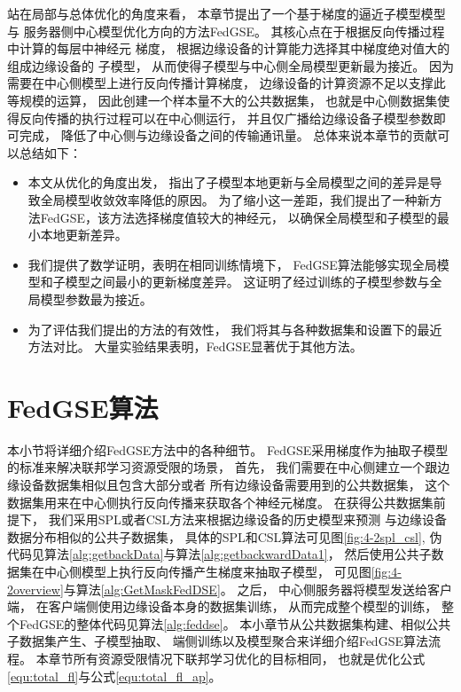 站在局部与总体优化的角度来看，
本章节提出了一个基于梯度的逼近子模型模型与
服务器侧中心模型优化方向的方法FedGSE。
其核心点在于根据反向传播过程中计算的每层中神经元
梯度，
根据边缘设备的计算能力选择其中梯度绝对值大的组成边缘设备的
子模型，
从而使得子模型与中心侧全局模型更新最为接近。
因为需要在中心侧模型上进行反向传播计算梯度，
边缘设备的计算资源不足以支撑此等规模的运算，
因此创建一个样本量不大的公共数据集，
也就是中心侧数据集使得反向传播的执行过程可以在中心侧运行，
并且仅广播给边缘设备子模型参数即可完成，
降低了中心侧与边缘设备之间的传输通讯量。
总体来说本章节的贡献可以总结如下：
\begin{itemize}
    \item 本文从优化的角度出发，
    指出了子模型本地更新与全局模型之间的差异是导致全局模型收敛效率降低的原因。
    为了缩小这一差距，我们提出了一种新方法FedGSE，该方法选择梯度值较大的神经元，
    以确保全局模型和子模型的最小本地更新差异。    

    \item 我们提供了数学证明，表明在相同训练情境下，
    FedGSE算法能够实现全局模型和子模型之间最小的更新梯度差异。
    这证明了经过训练的子模型参数与全局模型参数最为接近。
    
    \item 为了评估我们提出的方法的有效性，
    我们将其与各种数据集和设置下的最近方法对比。
    大量实验结果表明，FedGSE显著优于其他方法。
    
\end{itemize}



\section{FedGSE算法}
本小节将详细介绍FedGSE方法中的各种细节。
FedGSE采用梯度作为抽取子模型的标准来解决联邦学习资源受限的场景，
首先，
我们需要在中心侧建立一个跟边缘设备数据集相似且包含大部分或者
所有边缘设备需要用到的公共数据集，
这个数据集用来在中心侧执行反向传播来获取各个神经元梯度。
在获得公共数据集前提下，
我们采用SPL或者CSL方法来根据边缘设备的历史模型来预测
与边缘设备数据分布相似的公共子数据集，
具体的SPL和CSL算法可见图\ref{fig:4-2spl_csl},
伪代码见算法\ref{alg:getbackData}与算法\ref{alg:getbackwardData1}，
然后使用公共子数据集在中心侧模型上执行反向传播产生梯度来抽取子模型，
可见图\ref{fig:4-2overview}与算法\ref{alg:GetMaskFedDSE}。
之后，
中心侧服务器将模型发送给客户端，
在客户端侧使用边缘设备本身的数据集训练，
从而完成整个模型的训练，
整个FedGSE的整体代码见算法\ref{alg:feddse}。
本小章节从公共数据集构建、相似公共子数据集产生、子模型抽取、
端侧训练以及模型聚合来详细介绍FedGSE算法流程。
本章节所有资源受限情况下联邦学习优化的目标相同，
也就是优化公式\ref{equ:total_fl}与公式\ref{equ:total_fl_ap}。

